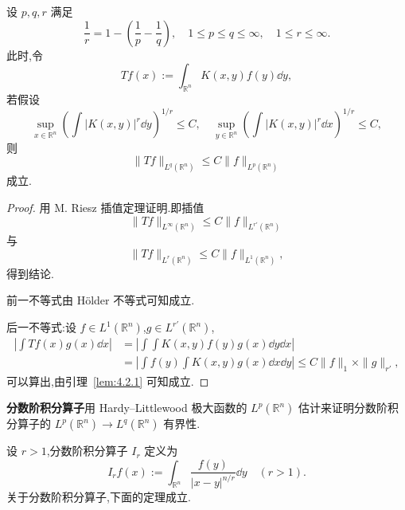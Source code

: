 \begin{proposition}\label{prop:4.2.2}
设 $p, q, r$ 满足
\begin{equation}
\frac{1}{r} = 1 - \left(\frac{1}{p} - \frac{1}{q}\right), \quad 1 \leq p \leq q \leq \infty, \quad 1 \leq r \leq \infty.\tag{4.2.1}
\label{eq:4.2.1}\end{equation}
此时,令
\begin{equation*}
Tf(x) := \int_{\mathbb{R}^{n}}K(x, y)f(y)\dd y,
\end{equation*}
若假设
\begin{equation*}
\sup_{x \in \mathbb{R}^{n}}\left(\int|K(x, y)|^{r}\dd y\right)^{1/r} \leq C, \quad \sup_{y \in \mathbb{R}^{n}}\left(\int|K(x, y)|^{r}\dd x\right)^{1/r} \leq C,
\end{equation*}
则
\begin{equation}
\|Tf\|_{L^{q}(\mathbb{R}^{n})} \leq C\|f\|_{L^{p}(\mathbb{R}^{n})}\tag{4.2.2}
\label{eq:4.2.2}\end{equation}
成立.
\end{proposition}

\begin{proof}
用 M. Riesz 插值定理证明.即插值
\begin{equation*}
\|Tf\|_{L^{\infty}(\mathbb{R}^{n})} \leq C\|f\|_{L^{r'}(\mathbb{R}^{n})}
\end{equation*}
与
\begin{equation*}
\|Tf\|_{L^{r}(\mathbb{R}^{n})} \leq C\|f\|_{L^{1}(\mathbb{R}^{n})},
\end{equation*}
得到结论.

前一不等式由 Hölder 不等式可知成立.

后一不等式:设 $f \in L^{1}(\mathbb{R}^{n})$,$g \in L^{r'}(\mathbb{R}^{n})$,
\begin{equation}
\begin{aligned}
\left|\int Tf(x)g(x)\dd x\right| & = \left|\int\int K(x, y)f(y)g(x)\dd y\dd x\right| \\
& = \left|\int f(y)\int K(x, y)g(x)\dd x\dd y\right| \leq C\|f\|_{1}\times\|g\|_{r'},
\end{aligned}
\end{equation}
可以算出,由引理~\ref{lem:4.2.1} 可知成立.
\end{proof}

\noindent\textbf{分数阶积分算子}\quad 用 Hardy--Littlewood 极大函数的 $L^{p}(\mathbb{R}^{n})$ 估计来证明分数阶积分算子的 $L^{p}(\mathbb{R}^{n}) \to L^{q}(\mathbb{R}^{n})$ 有界性.

设 $r > 1$,分数阶积分算子 $I_{r}$ 定义为
\begin{equation*}
I_{r}f(x) := \int_{\mathbb{R}^{n}}\frac{f(y)}{|x-y|^{n/r}}\dd y \quad (r > 1).
\end{equation*}
关于分数阶积分算子,下面的定理成立.

